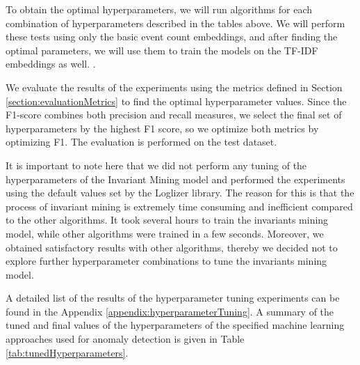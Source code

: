 
To obtain the optimal hyperparameters, we will run algorithms for each combination of hyperparameters described in the tables above. We will perform these tests using only the basic event count embeddings, and after finding the optimal parameters, we will use them to train the models on the TF-IDF embeddings as well. . 

We evaluate the results of the experiments using the metrics defined in Section \ref{section:evaluationMetrics} to find the optimal hyperparameter values. Since the F1-score combines both precision and recall measures, we select the final set of hyperparameters by the highest F1 score, so we optimize both metrics by optimizing F1. The evaluation is performed on the test dataset. 

It is important to note here that we did not perform any tuning of the hyperparameters of the Invariant Mining model and performed the experiments using the default values set by the Loglizer library. The reason for this is that the process of invariant mining is extremely time consuming and inefficient compared to the other algorithms. It took several hours to train the invariants mining model, while other algorithms were trained in a few seconds. Moreover, we obtained satisfactory results with other algorithms, thereby we decided not to explore further hyperparameter combinations to tune the invariants mining model.

A detailed list of the results of the hyperparameter tuning experiments can be found in the Appendix \ref{appendix:hyperparameterTuning}. A summary of the tuned and final values of the hyperparameters of the specified machine learning approaches used for anomaly detection is given in Table \ref{tab:tunedHyperparameters}. 

